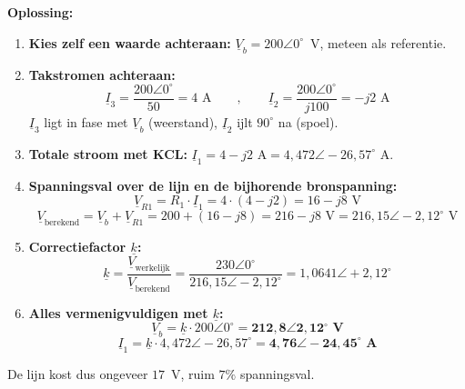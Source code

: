 \documentclass[a4paper,11pt]{article}
\begin{document}
\begin{oefening}
    \textbf{Oplossing:}
    \begin{enumerate}
        \item \textbf{Kies zelf een waarde achteraan:} $\underline{V}_b = 200\angle 0^\circ$~V, meteen als referentie.
        \item \textbf{Takstromen achteraan:}
              \[\underline{I}_3 = \frac{200\angle 0^\circ}{50} = 4\text{ A} \qquad,\qquad \underline{I}_2 = \frac{200\angle 0^\circ}{j100} = -j2\text{ A}\]
              $\underline{I}_3$ ligt in fase met $\underline{V}_b$ (weerstand), $\underline{I}_2$ ijlt $90^\circ$ na (spoel).
        \item \textbf{Totale stroom met KCL:} $\underline{I}_1 = 4 - j2\text{ A} = 4{,}472\angle -26{,}57^\circ\text{ A}$.
        \item \textbf{Spanningsval over de lijn en de bijhorende bronspanning:}
              \[\underline{V}_{R1} = R_1 \cdot \underline{I}_1 = 4 \cdot (4 - j2) = 16 - j8\text{ V}\]
              \[\underline{V}_{\text{berekend}} = \underline{V}_b + \underline{V}_{R1} = 200 + (16 - j8) = 216 - j8\text{ V} = 216{,}15\angle -2{,}12^\circ\text{ V}\]
        \item \textbf{Correctiefactor $\underline{k}$:}
              \[\underline{k} = \frac{\underline{V}_{\text{werkelijk}}}{\underline{V}_{\text{berekend}}} = \frac{230\angle 0^\circ}{216{,}15\angle -2{,}12^\circ} = 1{,}0641\angle +2{,}12^\circ\]
        \item \textbf{Alles vermenigvuldigen met $\underline{k}$:}
              \[\underline{V}_b = \underline{k} \cdot 200\angle 0^\circ = \mathbf{212{,}8\angle 2{,}12^\circ\text{ V}}\]
              \[\underline{I}_1 = \underline{k} \cdot 4{,}472\angle -26{,}57^\circ = \mathbf{4{,}76\angle -24{,}45^\circ\text{ A}}\]
    \end{enumerate}
    De lijn kost dus ongeveer $17$~V, ruim $7\%$ spanningsval.
\end{oefening}
\end{document}
